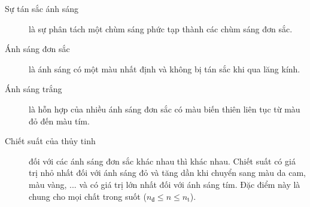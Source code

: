 \begin{description}
	
	\item[Sự tán sắc ánh sáng] là sự phân tách một chùm sáng phức tạp thành các chùm sáng đơn sắc.
	\item[Ánh sáng đơn sắc] là ánh sáng có một màu nhất định và không bị tán sắc khi qua lăng kính.
	\item[Ánh sáng trắng] là hỗn hợp của nhiều ánh sáng đơn sắc có màu biến thiên liên tục từ màu đỏ đến màu tím. 
	\item[Chiết suất của thủy tinh] đối với các ánh sáng đơn sắc khác nhau thì khác nhau. Chiết suất có giá trị nhỏ nhất đối với ánh sáng đỏ và tăng dần khi chuyển sang màu da cam, màu vàng, ... và có giá trị lớn nhất đối với ánh sáng tím. Đặc điểm này là chung cho mọi chất trong suốt ($n_{\text{đ}}\leq n \leq  n_{\text{t}} $).
\end{description}


